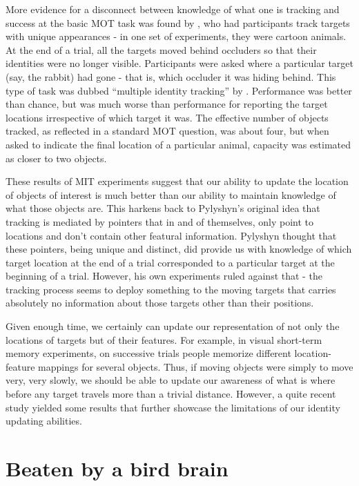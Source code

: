 \documentclass[
]{book}
\begin{document}
More evidence for a disconnect between knowledge of what one is tracking and success at the basic MOT task was found by \citet{horowitzTrackingUniqueObjects2007}, who had participants track targets with unique appearances - in one set of experiments, they were cartoon animals. At the end of a trial, all the targets moved behind occluders so that their identities were no longer visible. Participants were asked where a particular target (say, the rabbit) had gone - that is, which occluder it was hiding behind. This type of task was dubbed ``multiple identity tracking'' by \citet{oksamaMultipleObjectTracking2004}. Performance was better than chance, but was much worse than performance for reporting the target locations irrespective of which target it was. The effective number of objects tracked, as reflected in a standard MOT question, was about four, but when asked to indicate the final location of a particular animal, capacity was estimated as closer to two objects.

These results of MIT experiments suggest that our ability to update the location of objects of interest is much better than our ability to maintain knowledge of what those objects are. This harkens back to Pylyshyn's original idea that tracking is mediated by pointers that in and of themselves, only point to locations and don't contain other featural information. Pylyshyn thought that these pointers, being unique and distinct, did provide us with knowledge of which target location at the end of a trial corresponded to a particular target at the beginning of a trial. However, his own experiments ruled against that - the tracking process seems to deploy something to the moving targets that carries absolutely no information about those targets other than their positions.

Given enough time, we certainly can update our representation of not only the locations of targets but of their features. For example, in visual short-term memory experiments, on successive trials people memorize different location-feature mappings for several objects. Thus, if moving objects were simply to move very, very slowly, we should be able to update our awareness of what is where before any target travels more than a trivial distance. However, a quite recent study yielded some results that further showcase the limitations of our identity updating abilities.

\hypertarget{beaten-by-a-bird-brain}{%
\section{Beaten by a bird brain}\label{beaten-by-a-bird-brain}}
\end{document}
